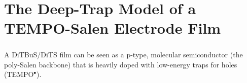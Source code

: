 \chapter{The Deep-Trap Model of a TEMPO-Salen Electrode Film}

\paragraph*{}
A DiTBuS/DiTS film can be seen as a p-type, molecular semiconductor (the poly-Salen backbone) that is heavily doped with low-energy traps for holes (TEMPO$^{\bullet}$).




